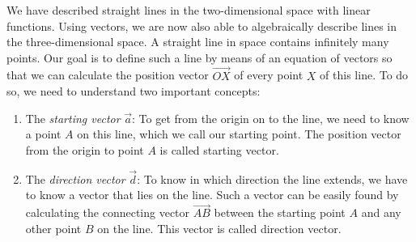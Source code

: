 \documentclass[12pt,eng]{skript_ogg}
\begin{document}
We have described straight lines in the two-dimensional space with linear functions. Using vectors, we are now also able to algebraically describe lines in the three-dimensional space. A straight line in space contains infinitely many points. Our goal is to define such a line by means of an equation of vectors so that we can calculate the position vector $\overrightarrow{OX}$ of every point $X$ of this line. To do so, we need to understand two important concepts:
\begin{enumerate}
	\item The \emph{starting vector} $\vec{a}$: To get from the origin on to the line, we need to know a point $A$ on this line, which we call our starting point. The position vector from the origin to point $A$ is called starting vector.
	\item The \emph{direction vector} $\vec{d}$: To know in which direction the line extends, we have to know a vector that lies on the line. Such a vector can be easily found by calculating the connecting vector $\overrightarrow{AB}$ between the starting point $A$ and any other point $B$ on the line. This vector is called direction vector.
\end{enumerate}
\end{document}
